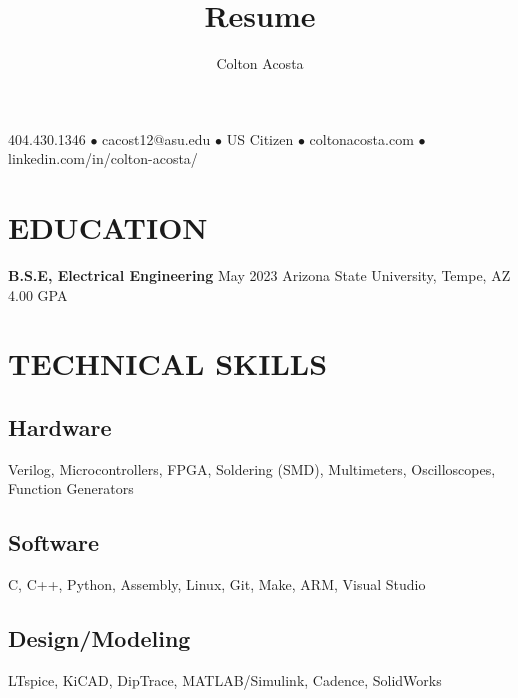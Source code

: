 \documentclass{article}
\makeatletter
\renewcommand{\maketitle}{
	\begin{center}
		{\huge\bfseries
			\theauthor}
			
		404.430.1346 $\bullet$ cacost12@asu.edu $\bullet$ US Citizen $\bullet$ coltonacosta.com $\bullet$ linkedin.com/in/colton-acosta/
	\end{center}
}
\makeatother
\begin{document}
\title{Resume}
\author{Colton Acosta}
\maketitle
\section{EDUCATION}
\textbf{B.S.E, Electrical Engineering}
\hfill 
May 2023
\linebreak
Arizona State University, Tempe, AZ 
\hfill
4.00 GPA

\section{TECHNICAL SKILLS}
\subsection{Hardware}
Verilog, Microcontrollers, FPGA, Soldering (SMD), Multimeters, Oscilloscopes, Function Generators 
\subsection{Software} 
C, C++, Python, Assembly, Linux, Git, Make, ARM, Visual Studio 
\subsection{Design/Modeling}
LTspice, KiCAD, DipTrace, MATLAB/Simulink, Cadence, SolidWorks
\end{document}
